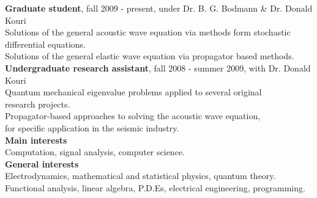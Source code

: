 \documentclass[letterpaper]{article}
\begin{document}
\begin{flushleft}
\hspace{0.25in} {\bf Graduate student}, fall 2009 - present, under Dr. B. G. Bodmann \& Dr. Donald Kouri \\
\vspace{0.15in}
\hspace{0.75in} Solutions of the general acoustic wave equation via methods form stochastic differential equations.\\
\vspace{0.15in}
\hspace{0.75in} Solutions of the general elastic wave equation via propagator based methods.\\
\vspace{0.15in}
\hspace{0.25in} {\bf Undergraduate research assistant}, fall 2008 - summer 2009, with Dr. Donald Kouri\\
\vspace{0.15in}
\hspace{0.75in} Quantum mechanical eigenvalue problems applied to several original\\
\hspace{0.75in}  research projects.\\
\vspace{0.15in}
\hspace{0.75in} Propagator-based approaches to solving the acoustic wave equation,\\
\hspace{0.75in} for specific application in the seismic industry.\\
\vspace{0.15in}
\hspace{0.25in} {\bf Main interests}\\
\vspace{0.15in}
\hspace{0.75in} Computation, signal analysis, computer science.\\
\vspace{0.15in}
\hspace{0.25in} {\bf General interests}\\
\vspace{0.15in}
\hspace{0.75in} Electrodynamics, mathematical and statistical physics, quantum theory.\\
\hspace{0.75in} Functional analysis, linear algebra, P.D.Es, electrical engineering, programming.
\end{flushleft}
\end{document}
